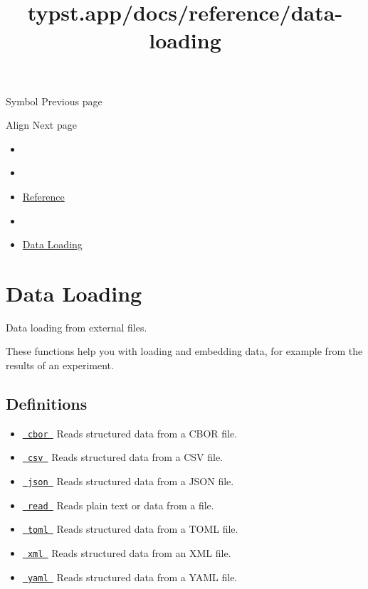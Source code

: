 { Symbol } { Previous page }

\href{/docs/reference/layout/align/}{\pandocbounded{}}

{ Align } { Next page }


\title{typst.app/docs/reference/data-loading}

\begin{itemize}
\tightlist
\item
  \href{/docs}{}
\item
  
\item
  \href{/docs/reference/}{Reference}
\item
  
\item
  \href{/docs/reference/data-loading/}{Data Loading}
\end{itemize}

\section{Data Loading}\label{summary}

Data loading from external files.

These functions help you with loading and embedding data, for example
from the results of an experiment.

\subsection{Definitions}\label{definitions}

\begin{itemize}
\tightlist
\item
  \href{/docs/reference/data-loading/cbor/}{\texttt{\ cbor\ }} { Reads
  structured data from a CBOR file. }
\item
  \href{/docs/reference/data-loading/csv/}{\texttt{\ csv\ }} { Reads
  structured data from a CSV file. }
\item
  \href{/docs/reference/data-loading/json/}{\texttt{\ json\ }} { Reads
  structured data from a JSON file. }
\item
  \href{/docs/reference/data-loading/read/}{\texttt{\ read\ }} { Reads
  plain text or data from a file. }
\item
  \href{/docs/reference/data-loading/toml/}{\texttt{\ toml\ }} { Reads
  structured data from a TOML file. }
\item
  \href{/docs/reference/data-loading/xml/}{\texttt{\ xml\ }} { Reads
  structured data from an XML file. }
\item
  \href{/docs/reference/data-loading/yaml/}{\texttt{\ yaml\ }} { Reads
  structured data from a YAML file. }
\end{itemize}

